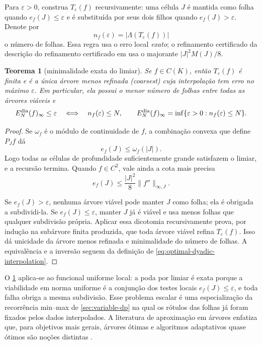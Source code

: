 \documentclass[11pt,a4paper]{article}
\newtheorem{theorem}{Teorema}[section]
\theoremstyle{definition}
\theoremstyle{remark}
\begin{document}
Para $\varepsilon>0$, construa $T_\varepsilon(f)$ recursivamente: uma célula
$J$ é mantida como folha quando $e_f(J)\le\varepsilon$ e é substituída por
seus dois filhos quando $e_f(J)>\varepsilon$. Denote por
\begin{equation}
 n_f(\varepsilon)=|\Lambda(T_\varepsilon(f))|
 \label{eq:threshold-count}
\end{equation}
o número de folhas. Essa regra usa o erro local \emph{exato}; o refinamento
certificado da descrição do refinamento certificado em \citet{oliveiraI} usa o majorante $|J|^2M(J)/8$.

\begin{theorem}[minimalidade exata do limiar]
\label{thm:threshold-optimality}
Se $f\in C(K)$, então $T_\varepsilon(f)$ é finita e é a única árvore
menos refinada (\emph{coarsest}) cuja interpolação tem erro no máximo $\varepsilon$. Em particular,
ela possui o menor número de folhas entre todas as árvores viáveis e
\begin{equation}
 E_N^{\rm dia}(f)_\infty\le\varepsilon
 \quad\Longleftrightarrow\quad
 n_f(\varepsilon)\le N,
 \qquad
 E_N^{\rm dia}(f)_\infty
 =\inf\{\varepsilon>0:n_f(\varepsilon)\le N\}.
 \label{eq:threshold-inversion}
\end{equation}
\end{theorem}

\begin{proof}
Se $\omega_f$ é o módulo de continuidade de $f$, a combinação convexa que
define $P_Jf$ dá
\[
 e_f(J)\le\omega_f(|J|).
\]
Logo todas as células de profundidade suficientemente grande satisfazem o
limiar, e a recursão termina. Quando $f\in C^2$, vale ainda a cota mais
precisa
\begin{equation}
 e_f(J)\le \frac{|J|^2}{8}\|f''\|_{\infty,J}.
 \label{eq:local-upper-basic}
\end{equation}

Se $e_f(J)>\varepsilon$, nenhuma árvore viável pode manter $J$ como folha;
ela é obrigada a subdividi-la. Se $e_f(J)\le\varepsilon$, manter $J$ já é
viável e usa menos folhas que qualquer subdivisão própria. Aplicar essa
dicotomia recursivamente prova, por indução na subárvore finita produzida,
que toda árvore viável refina $T_\varepsilon(f)$. Isso dá unicidade da árvore menos
refinada e minimalidade do número de folhas. A equivalência e a inversão seguem da
definição de \eqref{eq:optimal-dyadic-interpolation}.
\end{proof}

O \cref{thm:threshold-optimality} aplica-se ao funcional uniforme local: a
poda por limiar é exata porque a
viabilidade em norma uniforme é a conjunção dos testes locais
$e_f(J)\le\varepsilon$, e toda falha obriga a mesma subdivisão. Esse problema
escalar é uma especialização da recorrência min--max de
\cref{sec:variable-dp} na qual os
rótulos das folhas já foram fixados pelos dados interpolados. A literatura de
aproximação em árvores enfatiza que, para objetivos mais gerais, árvores
ótimas e algoritmos adaptativos quase ótimos são noções distintas
\citep{cohen2001,binev2004}.
\end{document}
